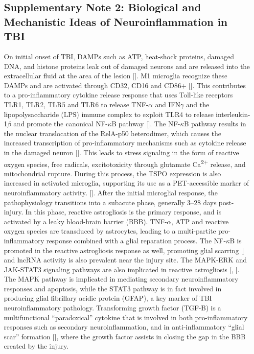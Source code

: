 \documentclass[times, twoside]{zHenriquesLab-StyleBioRxiv}
\begin{document}
		\subsection{Supplementary Note 2: Biological and Mechanistic Ideas of Neuroinflammation in TBI}
		On initial onset of TBI, DAMPs such as ATP, heat-shock proteins, damaged DNA, and histone proteins leak out of damaged neurons and are released into the extracellular fluid at the area of the lesion [\cite{cieri2025}]. 
		M1 microglia recognize these DAMPs and are activated through CD32, CD16 and CD86+ [\cite{loane2016}]. 
		This contributes to a pro-inflammatory cytokine release response that uses Toll-like receptors TLR1, TLR2, TLR5 and TLR6 to release TNF-\ensuremath{\alpha} and IFN\ensuremath{\gamma} and the lipopolysaccharide (LPS) immune complex to exploit TLR4 to release interleukin-1\ensuremath{\beta} and promote the canonical NF-\ensuremath{\kappa}B pathway [\cite{proces2025}]. 
		The NF-\ensuremath{\kappa}B pathway results in the nuclear translocation of the RelA-p50 heterodimer, which causes the increased transcription of pro-inflammatory mechanisms such as cytokine release in the damaged neuron [\cite{lawrence2009}]. 
		This leads to stress signaling in the form of reactive oxygen species, free radicals, excitotoxicity through glutamate Ca\textsuperscript{2+} release, and mitochondrial rupture. During this process, the TSPO expression is also increased in activated microglia, supporting its use as a PET-accessible marker of neuroinflammatory activity. [\cite{brackhan2016}].
		After the initial microglial response, the pathophysiology transitions into a subacute phase, generally 3--28 days post-injury. 
		In this phase, reactive astrogliosis is the primary response, and is activated by a leaky blood-brain barrier (BBB). 
		TNF-\ensuremath{\alpha}, ATP and reactive oxygen species are transduced by astrocytes, leading to a multi-partite pro-inflammatory response combined with a glial reparation process. 
		The NF-\ensuremath{\kappa}B is promoted in the reactive astrogliosis response as well, promoting glial scarring [\cite{cieri2025}] and lncRNA activity is also prevalent near the injury site. 
		The MAPK-ERK and JAK-STAT3 signaling pathways are also implicated in reactive astrogliosis [\cite{herrmann2008}, \cite{mandell1999}]. 
		The MAPK pathway is implicated in mediating secondary neuroinflammatory responses and apoptosis, while the STAT3 pathway is in fact involved in producing glial fibrillary acidic protein (GFAP), a key marker of TBI neuroinflammatory pathology. 
		Transforming growth factor (TGF-B) is a multifunctional “paradoxical” cytokine that is involved in both pro-inflammatory responses such as secondary neuroinflammation, and in anti-inflammatory “glial scar” formation [\cite{cieri2025}], where the growth factor assists in closing the gap in the BBB created by the injury. 
\end{document}
